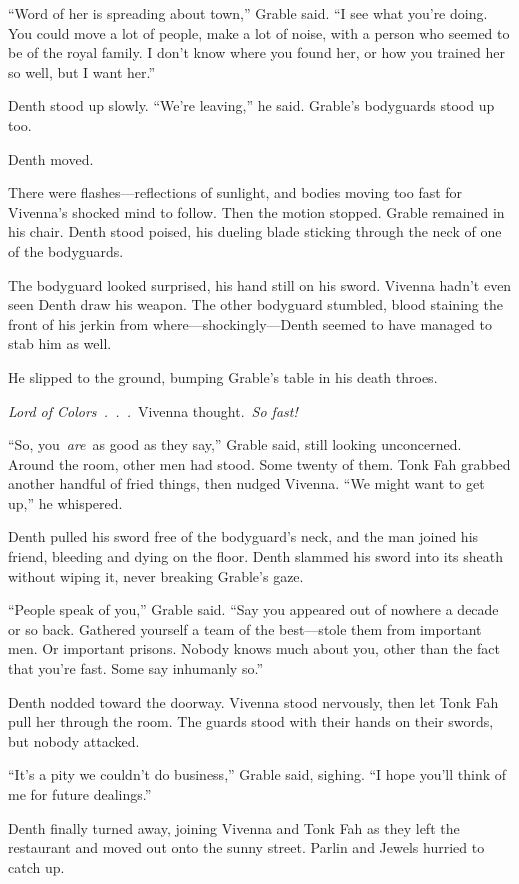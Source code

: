 “Word of her is spreading about town,” Grable said. “I see what you’re doing. You could move a lot of people, make a lot of noise, with a person who seemed to be of the royal family. I don’t know where you found her, or how you trained her so well, but I want her.”

Denth stood up slowly. “We’re leaving,” he said. Grable’s bodyguards stood up too.

Denth moved.

There were flashes—reflections of sunlight, and bodies moving too fast for Vivenna’s shocked mind to follow. Then the motion stopped. Grable remained in his chair. Denth stood poised, his dueling blade sticking through the neck of one of the bodyguards.

The bodyguard looked surprised, his hand still on his sword. Vivenna hadn’t even seen Denth draw his weapon. The other bodyguard stumbled, blood staining the front of his jerkin from where—shockingly—Denth seemed to have managed to stab him as well.

He slipped to the ground, bumping Grable’s table in his death throes.

\textit{Lord of Colors~.~.~.}~Vivenna thought.~\textit{So fast!}

“So, you~\textit{are}~as good as they say,” Grable said, still looking unconcerned. Around the room, other men had stood. Some twenty of them. Tonk Fah grabbed another handful of fried things, then nudged Vivenna. “We might want to get up,” he whispered.

Denth pulled his sword free of the bodyguard’s neck, and the man joined his friend, bleeding and dying on the floor. Denth slammed his sword into its sheath without wiping it, never breaking Grable’s gaze.

“People speak of you,” Grable said. “Say you appeared out of nowhere a decade or so back. Gathered yourself a team of the best—stole them from important men. Or important prisons. Nobody knows much about you, other than the fact that you’re fast. Some say inhumanly so.”

Denth nodded toward the doorway. Vivenna stood nervously, then let Tonk Fah pull her through the room. The guards stood with their hands on their swords, but nobody attacked.

“It’s a pity we couldn’t do business,” Grable said, sighing. “I hope you’ll think of me for future dealings.”

Denth finally turned away, joining Vivenna and Tonk Fah as they left the restaurant and moved out onto the sunny street. Parlin and Jewels hurried to catch up.

